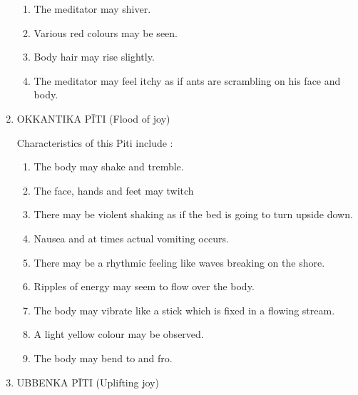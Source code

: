\documentclass[a5paper,10pt,english]{book}
\begin{document}
\begin{enumerate}
\begin{enumerate}
\item {} 
\sphinxAtStartPar
The meditator may shiver.

\item {} 
\sphinxAtStartPar
Various red colours may be seen.

\item {} 
\sphinxAtStartPar
Body hair may rise slightly.

\item {} 
\sphinxAtStartPar
The meditator may feel itchy as if ants are scrambling on his face and body.

\end{enumerate}

\item {} 
\sphinxAtStartPar
OKKANTIKA PĪTI (Flood of joy)

\sphinxAtStartPar
Characteristics of this Piti include :\sphinxhyphen{}
\begin{enumerate}
%
\item {} 
\sphinxAtStartPar
The body may shake and tremble.

\item {} 
\sphinxAtStartPar
The face, hands and feet may twitch

\item {} 
\sphinxAtStartPar
There may be violent shaking as if the bed is going to turn upside down.

\item {} 
\sphinxAtStartPar
Nausea and at times actual vomiting occurs.

\item {} 
\sphinxAtStartPar
There may be a rhythmic feeling like waves breaking on the shore.

\item {} 
\sphinxAtStartPar
Ripples of energy may seem to flow over the body.

\item {} 
\sphinxAtStartPar
The body may vibrate like a stick which is fixed in a flowing stream.

\item {} 
\sphinxAtStartPar
A light yellow colour may be observed.

\item {} 
\sphinxAtStartPar
The body may bend to and fro.

\end{enumerate}

\item {} 
\sphinxAtStartPar
UBBENKA PĪTI (Uplifting joy)


\end{enumerate}
\end{document}
